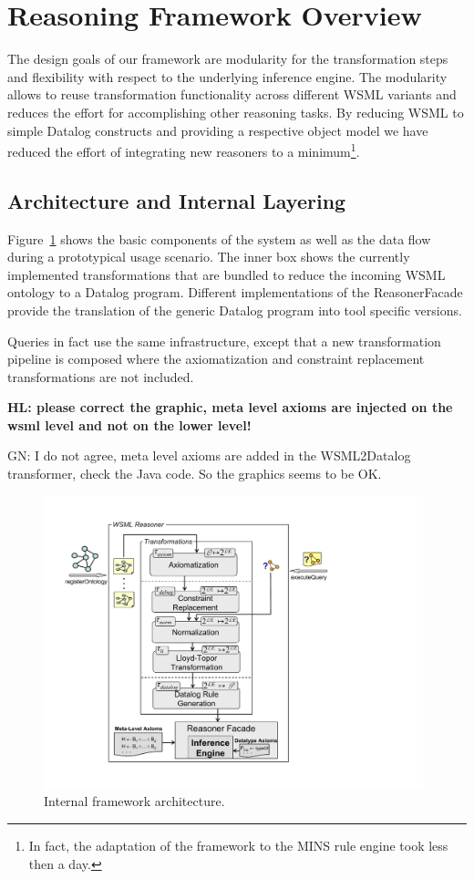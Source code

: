 \section{Reasoning Framework Overview\label{sec:framework}}

The design goals of our framework are modularity for the
transformation steps and flexibility with respect to the
underlying inference engine. The modularity allows to reuse
transformation functionality across different WSML variants and
reduces the effort for accomplishing other reasoning tasks. By
reducing WSML to simple Datalog constructs and providing a
respective object model we have reduced the effort of integrating
new reasoners to a minimum\footnote{In fact, the adaptation of the
framework to the MINS rule engine took less then a day.}.

\subsection{Architecture and Internal Layering}
Figure~\ref{fig:layering} shows the basic components of the system
 as well as the
data flow during a prototypical usage scenario. The inner box
shows the currently implemented transformations that are bundled
to reduce the incoming WSML ontology to a Datalog program.
Different implementations of the ReasonerFacade provide the
translation of the generic Datalog program into tool specific
versions.

Queries in fact use the same infrastructure, except that a new transformation pipeline is
composed where the axiomatization and constraint replacement transformations are not included.

{\bf HL: please correct the graphic, meta level axioms are injected
on the wsml level and not on the lower level!

GN: I do not agree, meta level axioms are added in the WSML2Datalog transformer, check the Java code. So the graphics seems to be OK.}

\begin{figure}[h]
    \includegraphics[width=11cm]{figures/layering}
    \centering
    \caption{Internal framework architecture. \label{fig:layering}}
\end{figure}


